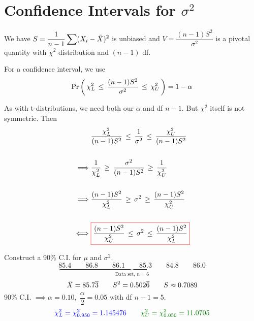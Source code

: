 \section{Confidence Intervals for \(\sigma^2\)}

\nl We have $S = \dfrac{1}{n-1} \displaystyle \sum (X_i-\bar{X})^2$ is unbiased and $V = \dfrac{(n-1)S^2}{\sigma^2}$ is a pivotal quantity with $\chi^2$ distribution and $(n-1)$ df.

\nl For a confidence interval, we use
$$\P{\,\chi^2_L \,\leq\, \frac{(n-1)S^2}{\sigma^2} \,\leq \, \chi^2_U \,} = 1 - \alpha$$

\nl As with t-distributions, we need both our $\alpha$ and df $n-1$. But $\chi^2$ itself is not symmetric. 
\noindent Then
\begin{align*}
	& \dfrac{\chi^2_L}{(n-1)S^2} \,\leq\, \dfrac{1}{\sigma^2} \,\leq\, \dfrac{\chi^2_U}{(n-1)S^2}\\\\
	\implies & \dfrac{1}{\chi^2_L} \,\geq\, \dfrac{\sigma^2}{(n-1)S^2} \,\geq\, \dfrac{1}{\chi^2_U}\\\\
	\implies & \dfrac{(n-1)S^2}{\chi^2_L} \,\geq\, \sigma^2 \,\geq\, \dfrac{(n-1)S^2}{\chi^2_U}\\\\
	\iff &  \color{red}\boxed{\color{black}  \dfrac{(n-1)S^2}{\chi^2_U} \,\leq\, \sigma^2 \,\leq\, \dfrac{(n-1)S^2}{\chi^2_L}}
\end{align*}
\begin{center}\end{center}


\newpage
{}

\newpage
{}

\newpage

\example Construct a 90\% C.I. for $\mu$ and $\sigma^2$.
$$\underbrace{85.4 \qquad 86.8 \qquad 86.1 \qquad 85.3 \qquad 84.8 \qquad 86.0}_{\textstyle \text{Data set, } n = 6}$$
$$\bar{X} = 85.7\overline{3} \qquad S^2 = 0.502\overline{6} \qquad S \approx 0.7089$$
90\% C.I. $\implies \alpha = 0.10, \; \dfrac{\alpha}{2} = 0.05$ with df $n-1 = 5$.
$$\color{blue} \chi^2_L = \chi^2_{0.950} = 1.145476 \qquad \color{ggreen}\chi^2_U = \chi^2_{0.050} = 11.0705\color{black}$$

